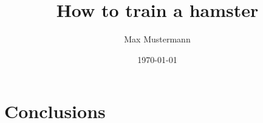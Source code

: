 \documentclass[ a4paper,
                oneside,
                toc=bibliography,
                toc=listof
                ]{scrbook}
\author{Max Mustermann}
\title{How to train a hamster}
\date{\today}
\begin{document}
 
    \frontmatter
    \makeISWtitle

	\cleardoublepage
	\setcounter{page}{1} %
    \declarationOfOriginality

    
    
    \cleardoublepage
    \tableofcontents
       

    \mainmatter
    
    \nocite{*}


    
    
    
    
    \chapter{Conclusions}

    
    \cleardoublepage
    \printbibliography
    
     \cleardoublepage
    
    
    \cleardoublepage
    \listoffigures
    
    \cleardoublepage
    \listoftables
    
    
    
\end{document}
